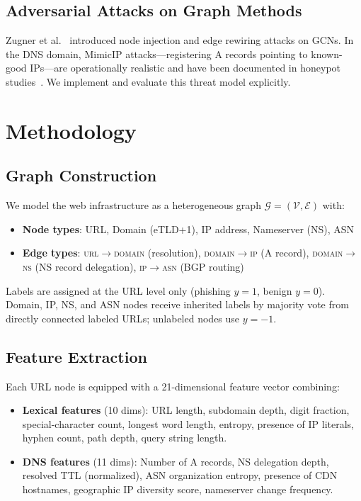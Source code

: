 \documentclass[conference]{IEEEtran}
\begin{document}
\subsection{Adversarial Attacks on Graph Methods}
Zugner et al.~\cite{zugner2018} introduced node injection and edge rewiring
attacks on GCNs. In the DNS domain, MimicIP attacks---registering A records
pointing to known-good IPs---are operationally realistic and have been
documented in honeypot studies~\cite{mimicip_ref}. We implement and evaluate
this threat model explicitly.

\section{Methodology}
\label{sec:method}

\subsection{Graph Construction}
\label{sec:graph}

We model the web infrastructure as a heterogeneous graph
$\mathcal{G} = (\mathcal{V}, \mathcal{E})$ with:
\begin{itemize}
  \item \textbf{Node types}: URL, Domain (eTLD+1), IP address, Nameserver (NS), ASN
  \item \textbf{Edge types}: \textsc{url}$\to$\textsc{domain} (resolution),
  \textsc{domain}$\to$\textsc{ip} (A record), \textsc{domain}$\to$\textsc{ns}
  (NS record delegation), \textsc{ip}$\to$\textsc{asn} (BGP routing)
\end{itemize}

Labels are assigned at the URL level only (phishing $y=1$, benign $y=0$).
Domain, IP, NS, and ASN nodes receive inherited labels by majority vote from
directly connected labeled URLs; unlabeled nodes use $y = -1$.

\subsection{Feature Extraction}
\label{sec:features}

Each URL node is equipped with a 21-dimensional feature vector combining:
\begin{itemize}
  \item \textbf{Lexical features} (10 dims): URL length, subdomain depth,
  digit fraction, special-character count, longest word length, entropy,
  presence of IP literals, hyphen count, path depth, query string length.
  \item \textbf{DNS features} (11 dims): Number of A records, NS delegation
  depth, resolved TTL (normalized), ASN organization entropy, presence of
  CDN hostnames, geographic IP diversity score, nameserver change frequency.
\end{itemize}
\end{document}
